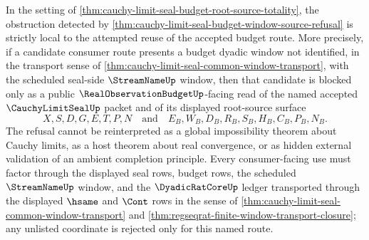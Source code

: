 \begin{corollary}
\label{cor:cauchy-limit-seal-budget-window-refusal-local-obstruction}
In the setting of \autoref{thm:cauchy-limit-seal-budget-root-source-totality}, the obstruction detected by \autoref{thm:cauchy-limit-seal-budget-window-source-refusal} is strictly local to the attempted reuse of the accepted budget route. More precisely, if a candidate consumer route presents a budget dyadic window not identified, in the transport sense of \autoref{thm:cauchy-limit-seal-common-window-transport}, with the scheduled seal-side $\StreamNameUp$ window, then that candidate is blocked only as a public $\RealObservationBudgetUp$-facing read of the named accepted $\CauchyLimitSealUp$ packet and of its displayed root-source surface
$$
X,S,D,G,E,T,P,N
\quad\text{and}\quad
E_B,W_B,D_B,R_B,S_B,H_B,C_B,P_B,N_B.
$$
The refusal cannot be reinterpreted as a global impossibility theorem about Cauchy limits, as a host theorem about real convergence, or as hidden external validation of an ambient completion principle. Every consumer-facing use must factor through the displayed seal rows, budget rows, the scheduled $\StreamNameUp$ window, and the $\DyadicRatCoreUp$ ledger transported through the displayed $\hsame$ and $\Cont$ rows in the sense of \autoref{thm:cauchy-limit-seal-common-window-transport} and \autoref{thm:regseqrat-finite-window-transport-closure}; any unlisted coordinate is rejected only for this named route.
\end{corollary}
